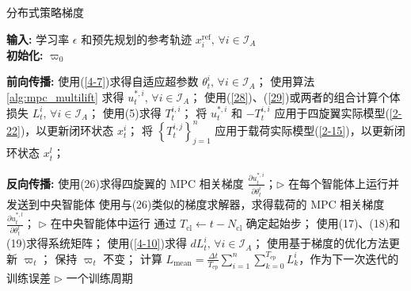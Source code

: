 \documentclass[lang=chs, degree=master, blindreview=false, winfonts=true]{yanputhesis}
\begin{document}
\begin{algorithm}[h]
    \caption{分布式策略梯度}
    \label{alg:distributed_pg}
    \textbf{输入:} 学习率 $\epsilon$ 和预先规划的参考轨迹 $x_i^{\text{ref}}, \, \forall i \in \mathcal{I}_A$\\
    \textbf{初始化:} $\varpi_0$
    
    \begin{algorithmic}[1]
                \State \textbf{前向传播:}
                \State 使用(\ref{4-7})求得自适应超参数 $\theta_t^i, \, \forall i \in \mathcal{I}_A$；
                \State 使用算法 \ref{alg:mpc_multilift} 求得 $u_t^{\ast,i}, \, \forall i \in \mathcal{I}_A$；
                \State 使用(\ref{28})、(\ref{29})或两者的组合计算个体损失 $L_t^i, \, \forall i \in \mathcal{I}_A$；
                    \State 使用(5)求得 $T_t^{i,i}$；
                    \State 将 $u_t^{\ast,i}$ 和 $-T_t^{i,i}$ 应用于四旋翼实际模型(\ref{2-22})，以更新闭环状态 $x_t^i$；
                \EndFor
                \State 将 $\left\{ T_t^{i,j} \right\}_{j=1}^n$ 应用于载荷实际模型(\ref{2-15})，以更新闭环状态 $x_t^l$；
                
                \State \textbf{反向传播:}
                    \State 使用(26)求得四旋翼的 MPC 相关梯度 $\frac{\partial u_t^{\ast,i}}{\partial \theta_t^i}$；$\triangleright$ 在每个智能体上运行并发送到中央智能体
                \EndFor
                \State 使用与(26)类似的梯度求解器，求得载荷的 MPC 相关梯度 $\frac{\partial u_t^{\ast,l}}{\partial \theta_t^l}$；
                \State $\triangleright$ 在中央智能体中运行
                    \State 通过 $T_{\text{cl}} \gets t - N_{\text{cl}}$ 确定起始步；
                    \State 使用(17)、(18)和(19)求得系统矩阵；
                    \State 使用(\ref{4-10})求得 $dL_t^i, \, \forall i \in \mathcal{I}_A$；
                    \State 使用基于梯度的优化方法更新 $\varpi_t$；
                \Else
                    \State 保持 $\varpi_t$ 不变；
                \EndIf
            \EndFor
            \State 计算 $L_{\text{mean}} = \frac{\Delta t}{T_{\text{ep}}} \sum_{i=1}^n \sum_{k=0}^{T_{\text{ep}}} L_k^i$，作为下一次迭代的训练误差 $\triangleright$ 一个训练周期
        \EndWhile
    \end{algorithmic}
\end{algorithm}
\end{document}
